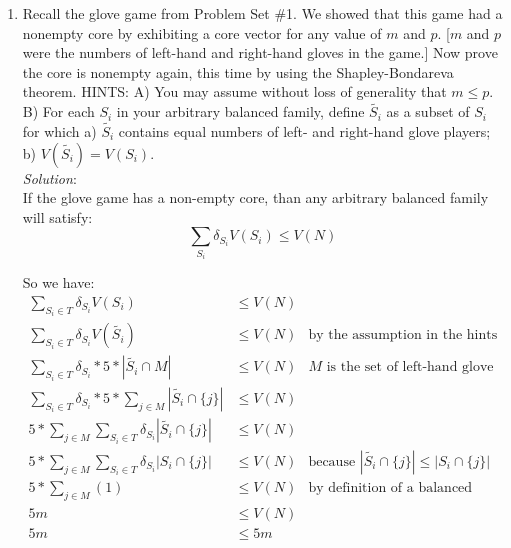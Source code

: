 \documentclass{article}
\begin{document}
\begin{enumerate}
%
\newpage
\item Recall the glove game from Problem Set \#1. We showed that this game had a nonempty core by exhibiting a core vector for any value of $m$ and $p$. [$m$ and $p$ were the numbers of left-hand and right-hand gloves in the game.] Now prove the core is nonempty again, this time by using the Shapley-Bondareva theorem. HINTS: A) You may assume without loss of generality that $m \le p$. B) For each $S_{i}$ in your arbitrary balanced family, define $\tilde{S_{i}}$ as a subset of $S_{i}$ for which a) $\tilde{S_{i}}$ contains equal numbers of left- and right-hand glove players; b) $V(\tilde{S_{i}}) = V(S_{i})$. \\

\textit{Solution}: \\
If the glove game has a non-empty core, than any arbitrary balanced family will satisfy:
\[\sum_{S_{i}}{\delta_{S_{i}} V(S_{i})} \le V(N)\]

So we have:
\begin{align*}
\sum_{S_{i} \in T}{\delta_{S_{i}} V(S_{i})}                                          &\le  V(N)  &   \\
\sum_{S_{i} \in T}{\delta_{S_{i}} V(\tilde{S_{i}})}                                  &\le  V(N)  &  \text{by the assumption in the hints} \\
\sum_{S_{i} \in T}{\delta_{S_{i}} * 5 * |\tilde{S_{i}} \cap M|}                      &\le  V(N)  &  M \text{ is the set of left-hand glove holding players} \\
\sum_{S_{i} \in T}{\delta_{S_{i}} * 5 * \sum_{j \in M}{|\tilde{S_{i}} \cap \{j\}|}}  &\le  V(N)  &   \\
5 * \sum_{j \in M}{\sum_{S_{i} \in T}{\delta_{S_{i}} |\tilde{S_{i}} \cap \{j\}|}}    &\le  V(N)  &   \\
5 * \sum_{j \in M}{\sum_{S_{i} \in T}{\delta_{S_{i}} |S_{i} \cap \{j\}|}}            &\le  V(N)  &  \text{because } |\tilde{S_{i}} \cap \{j\}| \le |S_{i} \cap \{j\}| \\
5 * \sum_{j \in M}{(1)}                                                              &\le  V(N)  &  \text{by definition of a balanced game} \\
5m                                                                                   &\le  V(N)  &   \\
5m                                                                                   &\le  5m    &   \\
\end{align*}


\end{enumerate}
\end{document}
